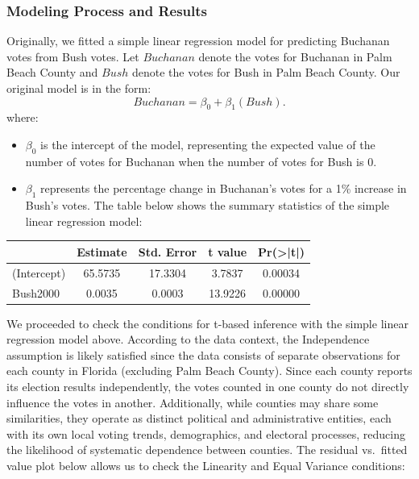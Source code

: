 \documentclass[
  letterpaper,
  DIV=11,
  numbers=noendperiod]{scrartcl}
\providecommand{\tightlist}{%
  \setlength{\itemsep}{0pt}\setlength{\parskip}{0pt}}\usepackage{longtable,booktabs,array}
\begin{document}
\hypertarget{modeling-process-and-results}{%
\subsubsection{Modeling Process and
Results}\label{modeling-process-and-results}}

Originally, we fitted a simple linear regression model for predicting
Buchanan votes from Bush votes. Let \(Buchanan\) denote the votes for
Buchanan in Palm Beach County and \(Bush\) denote the votes for Bush in
Palm Beach County. Our original model is in the form:
\[Buchanan = \beta_0 + \beta_1\left(Bush\right).\] where:

\begin{itemize}
\tightlist
\item
  \(\beta_0\) is the intercept of the model, representing the expected
  value of the number of votes for Buchanan when the number of votes for
  Bush is 0.
\end{itemize}

\begin{itemize}
\tightlist
\item
  \(\beta_1\) represents the percentage change in Buchanan's votes for a
  1\% increase in Bush's votes. The table below shows the summary
  statistics of the simple linear regression model:
\end{itemize}

\begin{table}[H]
\centering
\begin{tabular}[t]{lcccc}
\toprule
  & Estimate & Std. Error & t value & Pr(>|t|)\\
\midrule
(Intercept) & 65.5735 & 17.3304 & 3.7837 & 0.00034\\
Bush2000 & 0.0035 & 0.0003 & 13.9226 & 0.00000\\
\bottomrule
\end{tabular}
\end{table}

We proceeded to check the conditions for t-based inference with the
simple linear regression model above. According to the data context, the
Independence assumption is likely satisfied since the data consists of
separate observations for each county in Florida (excluding Palm Beach
County). Since each county reports its election results independently,
the votes counted in one county do not directly influence the votes in
another. Additionally, while counties may share some similarities, they
operate as distinct political and administrative entities, each with its
own local voting trends, demographics, and electoral processes, reducing
the likelihood of systematic dependence between counties. The residual
vs.~fitted value plot below allows us to check the Linearity and Equal
Variance conditions:
\end{document}
